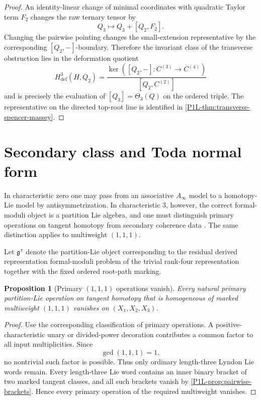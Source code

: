 \documentclass[11pt]{article}
\newtheorem{proposition}[theorem]{Proposition}
\theoremstyle{remark}
\begin{document}
\begin{proof}
An identity-linear change of minimal coordinates with quadratic Taylor term
\(F_2\) changes the raw ternary tensor by
\[
 Q_3\longmapsto Q_3+[Q_2,F_2].
\]
Changing the pairwise pointing changes the small-extension representative by
the corresponding \([Q_2,-]\)-boundary.  Therefore the invariant class of
the transverse obstruction lies in the deformation quotient
\[
 H^3_{\mathrm{def}}(H,Q_2)
 =\frac{\ker([Q_2,-]:C^{(3)}\to C^{(4)})}
 {[Q_2,C^{(2)}]}
\]
and is precisely the evaluation of \([Q_3]=\Theta_3(Q)\) on the ordered
triple.  The representative on the directed top-root line is identified in
\cref{P1L-thm:transverse-spencer-massey}.
\end{proof}

\section{Secondary class and Toda normal form}

In characteristic zero one may pass from an associative \(A_\infty\) model to a homotopy-Lie model by antisymmetrization.  In characteristic \(3\), however, the correct formal-moduli object is a partition Lie algebra, and one must distinguish primary operations on tangent homotopy from secondary coherence data \cite{BrantnerMathew,BCN}.  The same distinction applies to multiweight \((1,1,1)\).

Let \(\mathfrak g^\pi\) denote the partition-Lie object corresponding to the residual derived representation formal-moduli problem of the trivial rank-four representation together with the fixed ordered root-path marking.

\begin{proposition}[Primary \((1,1,1)\) operations vanish]\label{P1L-prop:primary-111}
Every natural primary partition-Lie operation on tangent homotopy that is homogeneous of marked multiweight \((1,1,1)\) vanishes on \((X_1,X_2,X_3)\).
\end{proposition}

\begin{proof}
Use the corresponding classification of primary operations.  A positive-characteristic unary or divided-power decoration contributes a common factor to all input multiplicities.  Since
\[
 \gcd(1,1,1)=1,
\]
no nontrivial such factor is possible.  Thus only ordinary length-three Lyndon Lie words remain.  Every length-three Lie word contains an inner binary bracket of two marked tangent classes, and all such brackets vanish by \cref{P1L-prop:pairwise-brackets}.  Hence every primary operation of the required multiweight vanishes.
\end{proof}
\end{document}
